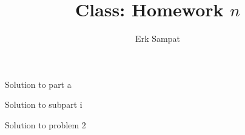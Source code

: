 \title{{\selectfont Class: } Homework $n$}
\author{Erk Sampat}



\maketitle
\prob
\begin{ppart}
	Solution to part a
\end{ppart}
\begin{ppart}
	\begin{spart}
		Solution to subpart i
	\end{spart}
\end{ppart}
\prob
Solution to problem 2

